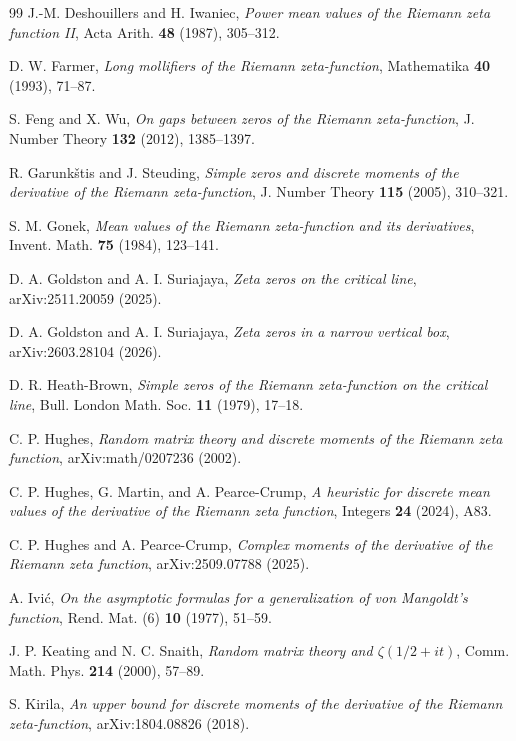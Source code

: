 \begin{thebibliography}{99}
J.-M. Deshouillers and H. Iwaniec,
\emph{Power mean values of the Riemann zeta function II},
Acta Arith. \textbf{48} (1987), 305--312.

D. W. Farmer,
\emph{Long mollifiers of the Riemann zeta-function},
Mathematika \textbf{40} (1993), 71--87.

S. Feng and X. Wu,
\emph{On gaps between zeros of the Riemann zeta-function},
J. Number Theory \textbf{132} (2012), 1385--1397.

R. Garunk\v{s}tis and J. Steuding,
\emph{Simple zeros and discrete moments of the derivative of the Riemann zeta-function},
J. Number Theory \textbf{115} (2005), 310--321.

S. M. Gonek,
\emph{Mean values of the Riemann zeta-function and its derivatives},
Invent. Math. \textbf{75} (1984), 123--141.

D. A. Goldston and A. I. Suriajaya,
\emph{Zeta zeros on the critical line},
arXiv:2511.20059 (2025).

D. A. Goldston and A. I. Suriajaya,
\emph{Zeta zeros in a narrow vertical box},
arXiv:2603.28104 (2026).

D. R. Heath-Brown,
\emph{Simple zeros of the Riemann zeta-function on the critical line},
Bull. London Math. Soc. \textbf{11} (1979), 17--18.

C. P. Hughes,
\emph{Random matrix theory and discrete moments of the Riemann zeta function},
arXiv:math/0207236 (2002).

C. P. Hughes, G. Martin, and A. Pearce-Crump,
\emph{A heuristic for discrete mean values of the derivative of the Riemann zeta function},
Integers \textbf{24} (2024), A83.

C. P. Hughes and A. Pearce-Crump,
\emph{Complex moments of the derivative of the Riemann zeta function},
arXiv:2509.07788 (2025).

A. Ivi\'c,
\emph{On the asymptotic formulas for a generalization of von Mangoldt's function},
Rend. Mat. (6) \textbf{10} (1977), 51--59.

J. P. Keating and N. C. Snaith,
\emph{Random matrix theory and $\zeta(1/2+it)$},
Comm. Math. Phys. \textbf{214} (2000), 57--89.

S. Kirila,
\emph{An upper bound for discrete moments of the derivative of the Riemann zeta-function},
arXiv:1804.08826 (2018).


\end{thebibliography}
